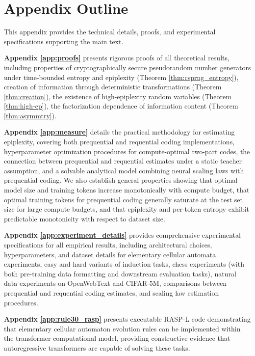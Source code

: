 \documentclass[twoside]{article}
\begin{document}

%

\newpage
\appendix
\onecolumn
%

\newpage


%
%
%




\section*{Appendix Outline}

This appendix provides the technical details, proofs, and experimental specifications supporting the main text. 

\textbf{Appendix \ref{app:proofs}} presents rigorous proofs of all theoretical results, including properties of cryptographically secure pseudorandom number generators under time-bounded entropy and epiplexity (Theorem \ref{thm:csprng_entropy}), creation of information through deterministic transformations (Theorem \ref{thm:creation}), the existence of high-epiplexity random variables (Theorem \ref{thm:high-ep}), the factorization dependence of information content (Theorem \ref{thm:asymmtry}).

\textbf{Appendix \ref{app:measure}} details the practical methodology for estimating epiplexity, covering both prequential and requential coding implementations, hyperparameter optimization procedures for compute-optimal two-part codes, the connection between prequential and requential estimates under a static teacher assumption, and a solvable analytical model combining neural scaling laws with prequential coding. We also establish general properties showing that optimal model size and training tokens increase monotonically with compute budget, that optimal training tokens for prequential coding generally saturate at the test set size for large compute budgets, and that epiplexity and per-token entropy exhibit predictable monotonicity with respect to dataset size.

\textbf{Appendix \ref{app:experiment_details}} provides comprehensive experimental specifications for all empirical results, including architectural choices, hyperparameters, and dataset details for elementary cellular automata experiments, easy and hard variants of induction tasks, chess experiments (with both pre-training data formatting and downstream evaluation tasks), natural data experiments on OpenWebText and CIFAR-5M, comparisons between prequential and requential coding estimates, and scaling law estimation procedures.

\textbf{Appendix \ref{app:rule30_rasp}} presents executable RASP-L code demonstrating that elementary cellular automaton evolution rules can be implemented within the transformer computational model, providing constructive evidence that autoregressive transformers are capable of solving these tasks.
\end{document}

